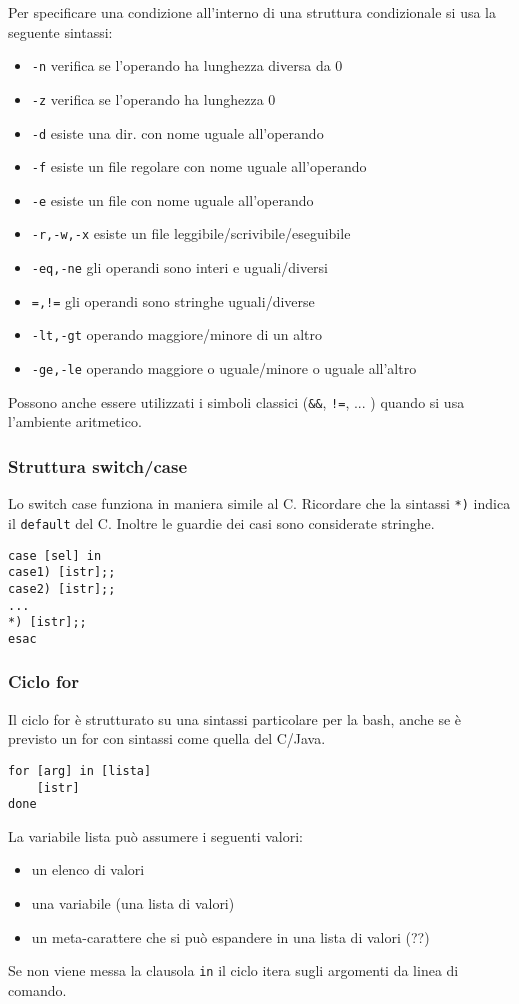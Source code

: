 \documentclass[a4paper]{article}
\begin{document}
Per specificare una condizione all'interno di una struttura condizionale si usa la seguente sintassi:
\begin{itemize}
\item \verb|-n| verifica se l'operando ha lunghezza diversa da 0
\item \verb|-z| verifica se l'operando ha lunghezza 0
\item \verb|-d| esiste una dir. con nome uguale all'operando
\item \verb|-f| esiste un file regolare con nome uguale all'operando
\item \verb|-e| esiste un file con nome uguale all'operando
\item \verb|-r,-w,-x| esiste un file leggibile/scrivibile/eseguibile
\item \verb|-eq,-ne| gli operandi sono interi e uguali/diversi
\item \verb|=,!=| gli operandi sono stringhe uguali/diverse
\item \verb|-lt,-gt| operando maggiore/minore di un altro
\item \verb|-ge,-le| operando maggiore o uguale/minore o uguale all'altro
\end{itemize}

Possono anche essere utilizzati i simboli classici (\verb|&&|, \verb|!=|, ... ) quando si usa l'ambiente aritmetico.

\subsubsection{Struttura switch/case}
Lo switch case funziona in maniera simile al C. Ricordare che la sintassi \verb|*)| indica il \verb|default| del C. Inoltre le guardie dei casi sono considerate stringhe.
\begin{verbatim}
case [sel] in
case1) [istr];;
case2) [istr];;
...
*) [istr];;
esac
\end{verbatim}

\subsubsection{Ciclo for}
Il ciclo for è strutturato su una sintassi particolare per la bash, anche se è previsto un for con sintassi come quella del C/Java.
\begin{verbatim}
for [arg] in [lista]
    [istr]
done
\end{verbatim}
La variabile lista può assumere i seguenti valori:
\begin{itemize}
\item un elenco di valori
\item una variabile (una lista di valori)
\item un meta-carattere che si può espandere in una lista di valori (??)
\end{itemize}
Se non viene messa la clausola \verb|in| il ciclo itera sugli argomenti da linea di comando.
\end{document}
